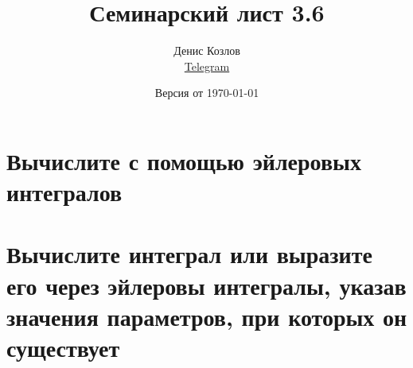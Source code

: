 \documentclass[a4paper, fleqn]{article}
\title{Семинарский лист 3.6}
\author{
    Денис Козлов         \\ \href{https://t.me/DKozl50}{Telegram} \and
}
\date{Версия от {\ddmmyyyydate\today} \currenttime}
\begin{document}
\maketitle

\section*{Вычислите с помощью эйлеровых интегралов}






\section*{Вычислите интеграл или выразите его через эйлеровы интегралы,
    указав значения параметров, при которых он существует}


\end{document}

